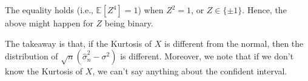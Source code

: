 \begin{eg}
	The equality holds (i.e., \(\mathbb{E}_{}[Z^4] = 1\)) when \(Z^2 = 1\), or \(Z \in \{ \pm 1 \} \). Hence, the above might happen for \(Z\) being binary.
\end{eg}

The takeaway is that, if the Kurtosis of \(X\) is different from the normal, then the distribution of \(\sqrt{n} (\hat{\sigma} _n^2 - \sigma ^2)\) is different. Moreover, we note that if we don't know the Kurtosis of \(X\), we can't say anything about the confident interval.